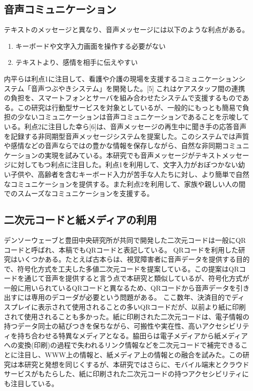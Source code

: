 \documentclass[submit,techrep,noauthor]{ipsj}
\begin{document}
\subsection{音声コミュニケーション}
テキストのメッセージと異なり、音声メッセージには以下のような利点がある。
\begin{enumerate}
    \item キーボードや文字入力画面を操作する必要がない
    \item テキストより、感情を相手に伝えやすい
\end{enumerate}
内平らは利点1に注目して、看護や介護の現場を支援するコミュニケーションシステム「音声つぶやきシステム」を開発した。[5] これはケアスタッフ間の連携の負担を、スマートフォンとサーバを組み合わせたシステムで支援するものである。この研究は行動型サービスを対象としているが、一般的にもっとも簡易で負担の少ないコミュニケーションは音声コミュニケーションであることを示唆している。利点2に注目した幸ら[6]は、音声メッセージの再生中に聞き手の応答音声を記録する非同期型音声メッセージシステムを提案した。このシステムでは声質や感情などの音声ならではの豊かな情報を保存しながら、自然な非同期コミュニケーションの実現を試みている。本研究でも音声メッセージがテキストメッセージに対してもつ利点に注目した。利点1を利用して、文字入力がおぼつかない幼い子供や、高齢者を含むキーボード入力が苦手な人たちに対し、より簡単で自然なコミュニケーションを提供する。また利点2を利用して、家族や親しい人の間でのスムーズなコミュニケーションを支援する。

\subsection{二次元コードと紙メディアの利用}
デンソーウェーブと豊田中央研究所が共同で開発した二次元コードは一般にQRコードと呼ばれ、本稿でもQRコードと表記している。
QRコードを利用した研究はいくつかある。たとえば古本らは、視覚障害者に音声データを提供する目的で、符号化方式を工夫した多値二次元コードを提案している。この提案はQRコードを通じて音声を提供すると言う点で本研究と類似しているが、符号化方式が一般に用いられているQRコードと異なるため、QRコードから音声データを引き出すには専用のデコーダが必要という問題がある。
ここ数年、決済目的でディスプレイに表示されて使用されることの多いQRコードだが、以前より紙に印刷されて使用されることも多かった。紙に印刷された二次元コードは、電子情報の持つデータ同士の結びつきを保ちながら、可搬性や実在性、高いアクセシビリティを持ち合わせる特異なメディアとなる。脇田らは電子メディアから紙メディアへの変換(印刷)の過程で失われるリンク情報などを二次元コードで補完できることに注目し、WWW上の情報と、紙メディア上の情報との融合を試みた。この研究は本研究と発想を同じくするが、本研究ではさらに、モバイル端末とクラウドサービスがもたらした、紙に印刷された二次元コードの持つアクセシビリティにも注目している。
\end{document}
